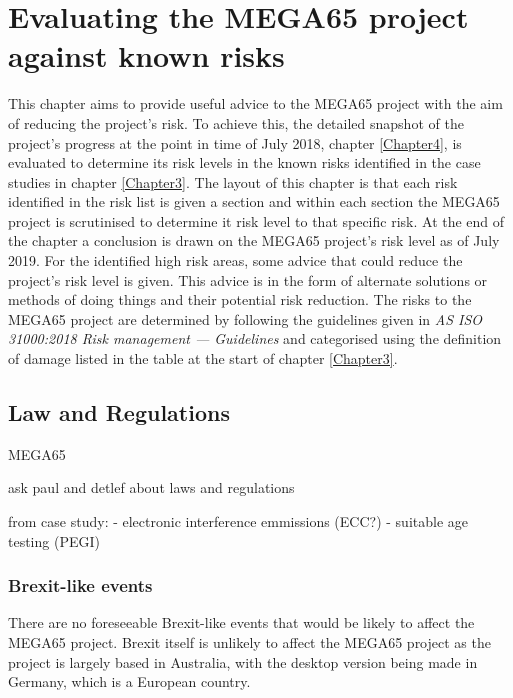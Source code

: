 %

\chapter{Evaluating the MEGA65 project against known risks}
\label{Chapter5}
This chapter aims to provide useful advice to the MEGA65 project with the aim of reducing the project's risk. To achieve this, the detailed snapshot of the project's progress at the point in time of July 2018, chapter \ref{Chapter4}, is evaluated to determine its risk levels in the known risks identified in the case studies in chapter \ref{Chapter3}. The layout of this chapter is that each risk identified in the risk list is given a section and within each section the MEGA65 project is scrutinised to determine it risk level to that specific risk. At the end of the chapter a conclusion is drawn on the MEGA65 project's risk level as of July 2019. For the identified high risk areas, some advice that could reduce the project's risk level is given. This advice is in the form of alternate solutions or methods of doing things and their potential risk reduction. The risks to the MEGA65 project are determined by following the guidelines given in \textit{AS ISO 31000:2018 Risk management — Guidelines} 
\cite{RN164} and categorised using the definition of damage listed in the table at the start of chapter \ref{Chapter3}.
\section{Law and Regulations}
MEGA65 

ask paul and detlef about laws and regulations

from case study:
- electronic interference emmissions (ECC?)
- suitable age testing (PEGI)

\subsection{Brexit-like events}
There are no foreseeable Brexit-like events that would be likely to affect the MEGA65 project. Brexit itself is unlikely to affect the MEGA65 project as the project is largely based in Australia, with the desktop version being made in Germany, which is a European country. 

